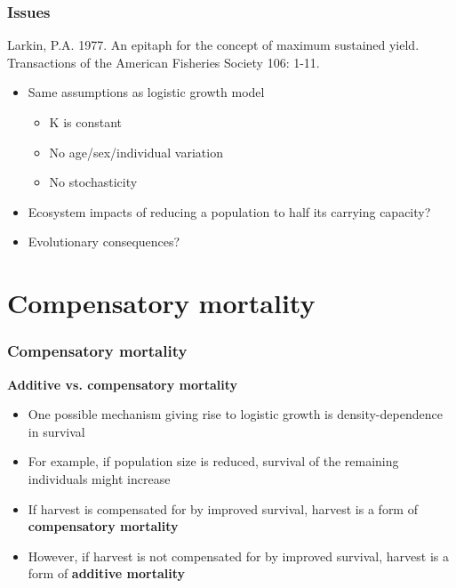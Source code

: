 \documentclass[color=usenames,dvipsnames]{beamer}\usepackage[]{graphicx}\usepackage[]{color}
\begin{document}
\begin{frame}
  \frametitle{Issues}
  {\flushleft Larkin, P.A. 1977. An epitaph for the concept of maximum
    sustained yield. Transactions of the American Fisheries Society 106: 1-11. \par}
  \pause
  \begin{itemize}%
    \item Same assumptions as logistic growth model
      \begin{itemize}
        \item<3-> K is constant
        \item<3-> No age/sex/individual variation
        \item<3-> No stochasticity
      \end{itemize}
    \item<4-> Ecosystem impacts of reducing a population
      to half its carrying capacity?
    \item<5-> Evolutionary consequences?
  \end{itemize}
\end{frame}





\section{Compensatory mortality}






\begin{frame}
  \frametitle{Compensatory mortality}
  \large
  {\bf Additive vs. compensatory mortality}
  \begin{itemize}[<+->]
    \item One possible mechanism giving rise to logistic growth is
      density-dependence in survival
    \item For example, if population size is reduced, survival of the
      remaining individuals might increase
    \item If harvest is compensated for by improved survival, harvest
      is a form of \alert{\bf compensatory mortality}
    \item However, if harvest is not compensated for by improved
      survival, harvest is a form of \alert{\bf additive mortality}
  \end{itemize}
  \vfill
\end{frame}
\end{document}
